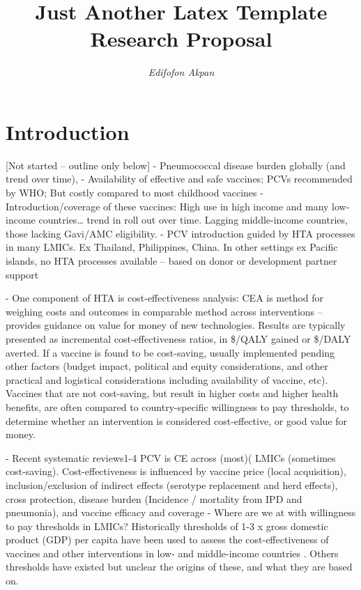 \documentclass[12pt]{article}
\title{\LARGE \bfseries \vspace{-1cm} Just Another Latex Template \\
    \LARGE \normalfont Research Proposal}
\author{\Large \textit{Edifofon Akpan}}
\date{ }
\begin{document}
\fontsize{13pt}{15pt}\selectfont

\maketitle


\section{Introduction}

[Not started – outline only below]
-	Pneumococcal disease burden globally (and trend over time), 
-	Availability of effective and safe vaccines; PCVs recommended by WHO; But costly compared to most childhood vaccines 
-	Introduction/coverage of these vaccines: High use in high income and many low-income countries… trend in roll out over time. Lagging middle-income countries, those lacking Gavi/AMC eligibility.
-	PCV  introduction guided by HTA processes in many LMICs. Ex Thailand, Philippines, China. In other settings ex Pacific islands, no HTA processes available – based on donor or development partner support 

-	One component of HTA is cost-effectiveness analysis: CEA is method for weighing costs and outcomes in comparable method across interventions – provides guidance on value for money of new technologies. Results are typically presented as incremental cost-effectiveness ratios, in \$/QALY gained or \$/DALY averted. If a vaccine is found to be cost-saving, usually implemented pending other factors (budget impact, political and equity considerations, and other practical and logistical considerations including availability of vaccine, etc). Vaccines that are not cost-saving, but result in higher costs and higher health benefits, are often compared to country-specific willingness to pay thresholds, to determine whether an intervention is considered cost-effective, or good value for money.

-	Recent systematic reviews1-4 PCV is CE across (most)( LMICs (sometimes cost-saving). Cost-effectiveness is influenced by vaccine price (local acquisition), inclusion/exclusion of indirect effects (serotype replacement and herd effects), cross protection, disease burden (Incidence / mortality from IPD and pneumonia), and vaccine efficacy and coverage
-	Where are we at with willingness to pay thresholds in LMICs? Historically thresholds of 1-3 x gross domestic product (GDP) per capita have been used to assess the cost-effectiveness of vaccines and other interventions in low- and middle-income countries . Others thresholds have existed but unclear the origins of these, and what they are based on.
\end{document}
